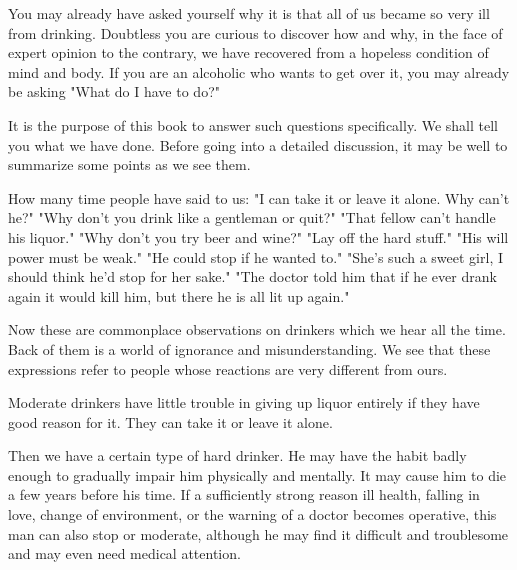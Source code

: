 \begin{biblechapter}
    You may already have asked yourself 
    why it is that all of us became so very ill from drinking. 
\verse Doubtless you are curious to discover how and why, 
    in the face of expert opinion to the contrary, 
    we have recovered from a hopeless condition of mind and body. 
\verse If you are an alcoholic who wants to get over it, 
    you may already be asking 
    "What do I have to do?"

\verse It is the purpose of this book 
    to answer such questions specifically. 
\verse We shall tell you what we have done. 
\verse Before going into a detailed discussion, 
    it may be well to summarize some points as we see them.

\verse How many time people have said to us: 
\verse "I can take it or leave it alone. Why can't he?" 
\verse "Why don't you drink like a gentleman or quit?" 
\verse "That fellow can't handle his liquor." 
\verse "Why don't you try beer and wine?" 
\verse "Lay off the hard stuff." 
\verse "His will power must be weak." 
\verse "He could stop if he wanted to." 
\verse "She's such a sweet girl, I should think he'd stop for her sake." 
\verse "The doctor told him that 
    if he ever drank again it would kill him, 
    but there he is all lit up again."

\verse Now these are commonplace observations on drinkers 
    which we hear all the time. 
\verse Back of them is a world of ignorance and misunderstanding. 
\verse We see that these expressions refer to people 
    whose reactions are very different from ours.
\end{biblechapter}


\begin{biblechapter}
\verse Moderate drinkers have little trouble in giving up liquor entirely 
    if they have good reason for it. 
\verse They can take it or leave it alone.

\verse Then we have a certain type of hard drinker. 
\verse He may have the habit badly enough to gradually impair him 
    physically and mentally. 
\verse It may cause him to die a few years before his time. 
\verse If a sufficiently strong reason 
    ill health, falling in love, change of environment, 
    or the warning of a doctor becomes operative, 
    this man can also stop or moderate, 
    although he may find it difficult and troublesome 
    and may even need medical attention.
\end{biblechapter}


